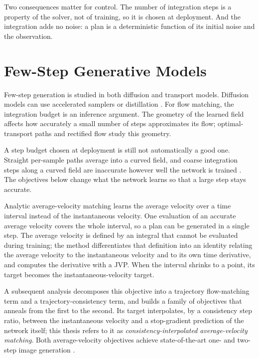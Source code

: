 \documentclass[headsepline,footsepline,footinclude=false,oneside,fontsize=11pt,paper=a4,listof=totoc,bibliography=totoc]{scrbook}
\theoremstyle{definition}
\theoremstyle{plain}
\theoremstyle{remark}
\begin{document}
Two consequences matter for control. The number of integration steps is a property of the solver, not
of training, so it is chosen at deployment. And the integration adds no noise: a plan is a
deterministic function of its initial noise and the observation.

\section{Few-Step Generative Models}\label{sec:bg:fewstep}

Few-step generation is studied in both diffusion and transport models. Diffusion models can use
accelerated samplers \parencite{song2021denoising} or distillation \parencite{wang2024onedp}.
For flow matching, the integration budget is an inference argument. The geometry of the learned
field affects how accurately a small number of steps approximates its flow; optimal-transport paths
\parencite{lipman2023flow} and rectified flow \parencite{liu2023flow} study this geometry.

A step budget chosen at deployment is still not automatically a good one. Straight per-sample paths
average into a curved field, and coarse integration steps along a curved field are inaccurate however
well the network is trained \parencite[Sec.~3]{geng2025meanflow}. The objectives below change what the
network learns so that a large step stays accurate.

Analytic average-velocity matching \parencite{geng2025meanflow} learns the average velocity over a
time interval instead of the instantaneous velocity. One evaluation of an accurate average velocity covers the whole interval, so a
plan can be generated in a single step. The average velocity is defined by an integral that cannot be
evaluated during training; the method differentiates that definition into an identity relating the
average velocity to the instantaneous velocity and to its own time derivative, and computes the
derivative with a \ac{JVP}. When the interval shrinks to a point, its target becomes the
instantaneous-velocity target.

A subsequent analysis \parencite{zhang2025alphaflow} decomposes this objective into a
trajectory flow-matching term and a trajectory-consistency term, and builds a family of objectives
that anneals from the first to the second. Its target interpolates, by a consistency step ratio,
between the instantaneous velocity and a stop-gradient prediction of the network itself; this thesis
refers to it as \emph{consistency-interpolated average-velocity matching}. Both average-velocity
objectives achieve state-of-the-art one- and two-step image generation
\parencite{geng2025meanflow,zhang2025alphaflow}.
\end{document}

